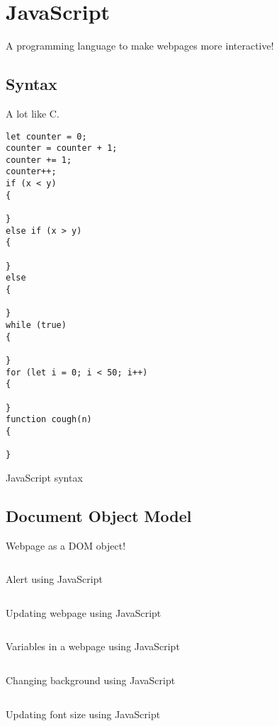 \chapter{JavaScript}
A programming language to make webpages more interactive!

\section{Syntax}
A lot like C.

\begin{code}
	\begin{verbatim}
let counter = 0;
counter = counter + 1;
counter += 1;
counter++;
if (x < y)
{

}
else if (x > y)
{

}
else
{

}
while (true)
{

}
for (let i = 0; i < 50; i++)
{

}
function cough(n)
{

}
	\end{verbatim}
	\caption{JavaScript syntax}
\end{code}

\section{Document Object Model}
Webpage as a DOM object!

\begin{code}
	\inputminted{html}{codes/web/js/alert2.html}
	\caption{Alert using JavaScript}
\end{code}

\begin{code}
	\inputminted{html}{codes/web/js/hello.html}
	\caption{Updating webpage using JavaScript}
\end{code}

\begin{code}
	\inputminted{html}{codes/web/js/counter.html}
	\caption{Variables in a webpage using JavaScript}
\end{code}

\clearpage
\begin{code}
	\inputminted{html}{codes/web/js/background.html}
	\caption{Changing background using JavaScript}
\end{code}

\clearpage
\begin{code}
	\inputminted{html}{codes/web/js/size.html}
	\caption{Updating font size using JavaScript}
\end{code}


